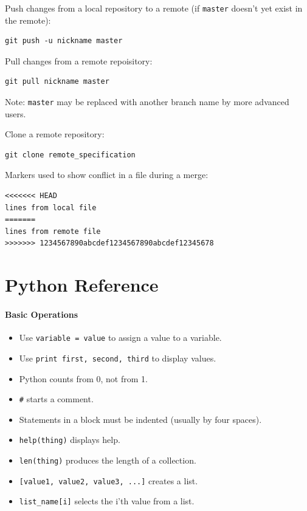 \documentclass[]{book}
\begin{document}
Push changes from a local repository to a remote (if \texttt{master}
doesn't yet exist in the remote):

\begin{verbatim}
git push -u nickname master
\end{verbatim}

Pull changes from a remote repoisitory:

\begin{verbatim}
git pull nickname master
\end{verbatim}

Note: \texttt{master} may be replaced with another branch name by more
advanced users.

Clone a remote repository:

\begin{verbatim}
git clone remote_specification
\end{verbatim}

Markers used to show conflict in a file during a merge:

\begin{verbatim}
<<<<<<< HEAD
lines from local file
=======
lines from remote file
>>>>>>> 1234567890abcdef1234567890abcdef12345678
\end{verbatim}

\section{Python Reference}

\mbox{}\paragraph{Basic Operations}

\begin{itemize}
\item
  Use \texttt{variable = value} to assign a value to a variable.
\item
  Use \texttt{print first, second, third} to display values.
\item
  Python counts from 0, not from 1.
\item
  \texttt{\#} starts a comment.
\item
  Statements in a block must be indented (usually by four spaces).
\item
  \texttt{help(thing)} displays help.
\item
  \texttt{len(thing)} produces the length of a collection.
\item
  \texttt{{[}value1, value2, value3, ...{]}} creates a list.
\item
  \texttt{list\_name{[}i{]}} selects the i'th value from a list.
\end{itemize}
\end{document}
